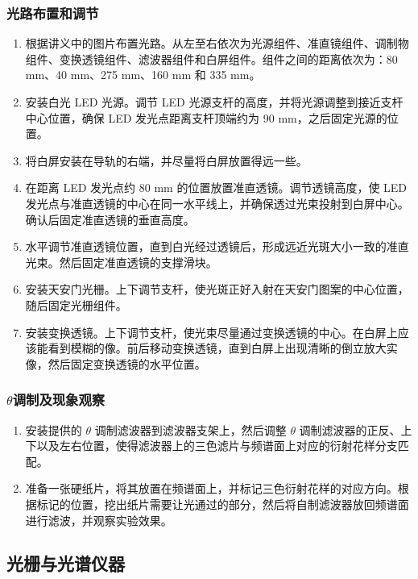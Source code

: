 \documentclass[UTF-8,twoside,cs4size]{ctexart}
\begin{document}
\subsubsection{光路布置和调节}
\begin{enumerate}
    \item 根据讲义中的图片布置光路。从左至右依次为光源组件、准直镜组件、调制物组件、变换透镜组件、滤波器组件和白屏组件。组件之间的距离依次为：80 mm、40 mm、275 mm、160 mm 和 335 mm。
    
    \item 安装白光 LED 光源。调节 LED 光源支杆的高度，并将光源调整到接近支杆中心位置，确保 LED 发光点距离支杆顶端约为 90 mm，之后固定光源的位置。
    
    \item 将白屏安装在导轨的右端，并尽量将白屏放置得远一些。
    
    \item 在距离 LED 发光点约 80 mm 的位置放置准直透镜。调节透镜高度，使 LED 发光点与准直透镜的中心在同一水平线上，并确保透过光束投射到白屏中心。确认后固定准直透镜的垂直高度。
    
    \item 水平调节准直透镜位置，直到白光经过透镜后，形成远近光斑大小一致的准直光束。然后固定准直透镜的支撑滑块。
    
    \item 安装天安门光栅。上下调节支杆，使光斑正好入射在天安门图案的中心位置，随后固定光栅组件。
    
    \item 安装变换透镜。上下调节支杆，使光束尽量通过变换透镜的中心。在白屏上应该能看到模糊的像。前后移动变换透镜，直到白屏上出现清晰的倒立放大实像，然后固定变换透镜的水平位置。
\end{enumerate}
\subsubsection{$\theta$调制及现象观察}
\begin{enumerate}
    \item 安装提供的 \(\theta\) 调制滤波器到滤波器支架上，然后调整 \(\theta\) 调制滤波器的正反、上下以及左右位置，使得滤波器上的三色滤片与频谱面上对应的衍射花样分支匹配。
    
    \item 准备一张硬纸片，将其放置在频谱面上，并标记三色衍射花样的对应方向。根据标记的位置，挖出纸片需要让光通过的部分，然后将自制滤波器放回频谱面进行滤波，并观察实验效果。
\end{enumerate}
\subsection{光栅与光谱仪器}
\end{document}
